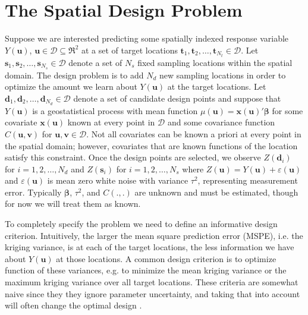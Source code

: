 \documentclass[cmbright]{staauth}
\begin{document}
\section{The Spatial Design Problem}\label{sec:spatialdesign}
Suppose we are interested predicting some spatially indexed response variable $Y(\bm{u})$, $\bm{u}\in \mathcal{D}\subseteq \Re^2$ at a set of target locations $\bm{t}_1, \bm{t}_2, \dots, \bm{t}_{N_t}\in\mathcal{D}$. Let $\bm{s}_1, \bm{s}_2, \dots, \bm{s}_{N_s}\in\mathcal{D}$ denote a set of $N_s$ fixed sampling locations within the spatial domain. The design problem is to add $N_d$ new sampling locations in order to optimize the amount we learn about $Y(\bm{u})$ at the target locations. Let $\bm{d}_1, \bm{d}_2, \dots, \bm{d}_{N_d}\in\mathcal{D}$ denote a set of candidate design points and suppose that $Y(\bm{u})$ is a geostatistical process with mean function $\mu(\bm{u})=\bm{x}(\bm{u})'\bm{\beta}$ for some covariate $\bm{x}(\bm{u})$ known at every point in $\mathcal{D}$ and some covariance function $C(\bm{u}, \bm{v})$ for $\bm{u},\bm{v}\in\mathcal{D}$. Not all covariates can be known a priori at every point in the spatial domain; however, covariates that are known functions of the location satisfy this constraint. Once the design points are selected, we observe $Z(\bm{d}_i)$ for $i=1,2,\dots,N_d$ and $Z(\bm{s}_i)$ for $i=1,2,\dots,N_s$ where $Z(\bm{u}) = Y(\bm{u}) + \varepsilon(\bm{u})$ and $\varepsilon(\bm{u})$ is mean zero white noise with variance $\tau^2$, representing measurement error. Typically $\bm{\beta}$, $\tau^2$, and $C(.,.)$ are unknown and must be estimated, though for now we will treat them as known.

To completely specify the problem we need to define an informative design criterion. Intuitively, the larger the mean square prediction error (MSPE), i.e. the kriging variance, is at each of the target locations, the less information we have about $Y(\bm{u})$ at those locations. A common design criterion is to optimize function of these variances, e.g. to minimize the mean kriging variance or the maximum kriging variance over all target locations. These criteria are somewhat naive since they they ignore parameter uncertainty, and taking that into account will often change the optimal design \citep{zimmerman2006optimal}.
\end{document}
